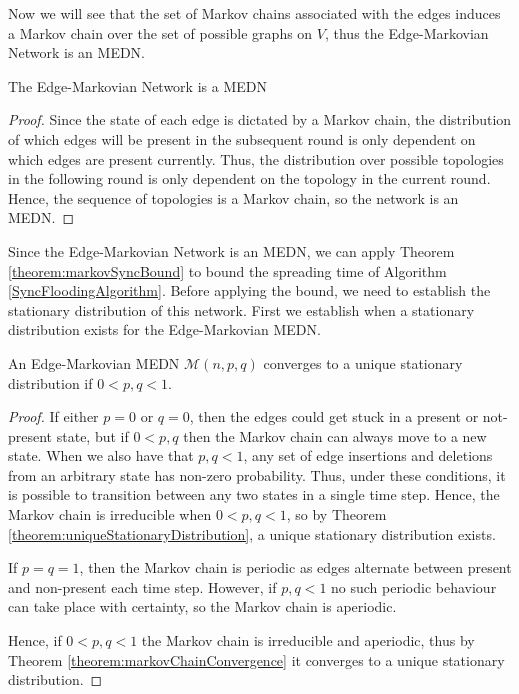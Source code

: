 Now we will see that the set of Markov chains associated with the edges induces a Markov chain over the set of possible graphs on $V$, thus the Edge-Markovian Network is an MEDN.

\begin{lemma}
	The Edge-Markovian Network is a MEDN
\end{lemma}

\begin{proof}
	Since the state of each edge is dictated by a Markov chain, the distribution of which edges will be present in the subsequent round is only dependent on which edges are present currently.
	Thus, the distribution over possible topologies in the following round is only dependent on the topology in the current round.
	Hence, the sequence of topologies is a Markov chain, so the network is an MEDN.
\end{proof}

Since the Edge-Markovian Network is an MEDN, we can apply Theorem \ref{theorem:markovSyncBound} to bound the spreading time of Algorithm \ref{SyncFloodingAlgorithm}. Before applying the bound, we need to establish the stationary distribution of this network. First we establish when a stationary distribution exists for the Edge-Markovian MEDN.

\begin{lemma}
	An Edge-Markovian MEDN $\mathcal{M}(n, p, q)$ converges to a unique stationary distribution if $0 < p, q < 1$.
\end{lemma}

\begin{proof}
	If either $p=0$ or $q=0$, then the edges could get stuck in a present or not-present state, but if $0 < p, q$ then the Markov chain can always move to a new state. When we also have that $p, q < 1$, any set of edge insertions and deletions from an arbitrary state has non-zero probability. Thus, under these conditions, it is possible to transition between any two states in a single time step. Hence, the Markov chain is irreducible when $0 < p, q < 1$, so by Theorem \ref{theorem:uniqueStationaryDistribution}, a unique stationary distribution exists.

	If $p=q=1$, then the Markov chain is periodic as edges alternate between present and non-present each time step. However, if $p, q < 1$ no such periodic behaviour can take place with certainty, so the Markov chain is aperiodic.

	Hence, if $0 < p, q < 1$ the Markov chain is irreducible and aperiodic, thus by Theorem \ref{theorem:markovChainConvergence}
	it converges to a unique stationary distribution.
\end{proof}

